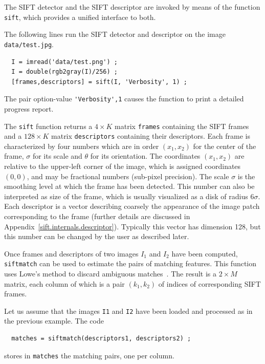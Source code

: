 \documentclass{article}
\let\oldtt=\tt
\renewcommand{\tt}{\oldtt\color{codecolor}}
\begin{document}
The SIFT detector and the SIFT descriptor are invoked by means of the function {\tt sift}, which provides a unified interface to both.

\begin{example}[Invocation]
The following lines run the SIFT detector and descriptor on the image {\tt data/test.jpg}.
\begin{verbatim}
  I = imread('data/test.png') ;
  I = double(rgb2gray(I)/256) ;
  [frames,descriptors] = sift(I, 'Verbosity', 1) ;
\end{verbatim}
The pair option-value \verb$'Verbosity',1$ causes the function to print a detailed progress report.
\end{example}

The {\tt sift} function returns a $4\times K$ matrix {\tt frames} containing the SIFT frames and a $128 \times K$ matrix {\tt descriptors} containing their descriptors. Each frame is characterized by four numbers which are in order $(x_1,x_2)$ for the center of the frame, $\sigma$ for its scale and $\theta$ for its orientation. The coordinates $(x_1,x_2)$ are relative to the upper-left corner of the image, which is assigned coordinates $(0,0)$, and may be fractional numbers (sub-pixel precision). The scale $\sigma$ is the smoothing level at which the frame has been detected. This number can also be interpreted as size of the frame, which is usually visualized as a disk of radius $6\sigma$. Each descriptor is a vector describing coarsely the appearance of the image patch corresponding to the frame (further details are discussed in Appendix~\ref{sift.internals.descriptor}). Typically this vector has dimension 128, but this number can be changed by the user as described later.

Once frames and descriptors of two images $I_1$ and $I_2$ have been computed, {\tt siftmatch} can be used to estimate the pairs of matching features. This function uses Lowe's method to discard ambiguous matches~\cite{lowe04distinctive}. The result is a $2\times M$ matrix,  each column of which is a pair $(k_1,k_2)$ of indices of corresponding SIFT frames.
\begin{example}[Matching]
Let us assume that the images {\tt I1} and {\tt I2} have been loaded and processed as in the previous example. The code
\begin{verbatim}
  matches = siftmatch(descriptors1, descriptors2) ;
\end{verbatim}
stores in {\tt matches} the matching pairs, one per column.
\end{example}
\end{document}

